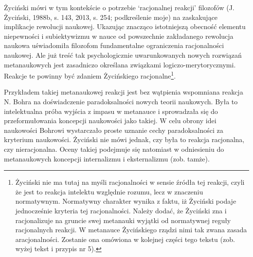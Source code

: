 \documentclass{article}
\begin{document}
Życiński mówi w tym kontekście o potrzebie ‘racjonalnej reakcji’ filozofów \label{ref:RNDTgN8tnj5Jz}(J. Życiński, 1988b,
s. 143, 2013, s. 254; podkreślenie moje) na zaskakujące implikacje rewolucji naukowej. Ukazując znacząco istotniejszą
obecność elementu niepewności i subiektywizmu w nauce od powszechnie zakładanego rewolucja naukowa uświadomiła
filozofom fundamentalne ograniczenia racjonalności naukowej. Ale już treść tak psychologicznie uwarunkowanych nowych
rozwiązań metanaukowych jest zasadniczo określana związkami logiczo-merytorycznymi. Reakcje te powinny być zdaniem
Życińskiego racjonalne\footnote{Życiński nie ma tutaj na myśli racjonalności w sensie źródła tej reakcji, czyli że jest
to reakcja intelektu względnie rozumu, lecz w znaczeniu normatywnym. Normatywny charakter wynika z faktu, iż Życiński
podaje jednocześnie kryteria tej racjonalności. Należy dodać, że Życiński zna i racjonalizuje na gruncie swej metanauki
wyjątki od normatywnej reguły racjonalnych reakcji. W metanauce Życińskiego rządzi nimi tak zwana zasada
aracjonalności. Zostanie ona omówiona w kolejnej części tego tekstu (zob. wyżej tekst i przypis nr 5).}.

Przykładem takiej metanaukowej reakcji jest bez wątpienia wspomniana reakcja N. Bohra na doświadczenie paradoksalności
nowych teorii naukowych. Była to intelektualna próba wyjścia z impasu w metanauce i sprowadzała się do przeformułowania
koncepcji naukowości jako takiej. W celu obrony idei naukowości Bohrowi wystarczało proste uznanie cechy
paradoksalności za kryterium naukowości. Życiński nie mówi jednak, czy była to reakcja racjonalna, czy nieracjonalna.
Oceny takiej podejmuje się natomiast w odniesieniu do metanaukowych koncepcji internalizmu i eksternalizmu (zob.
tamże).
\end{document}
